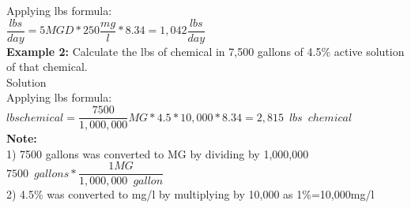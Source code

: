 Applying lbs formula:\\
$\dfrac{lbs}{day}=5 MGD *250\dfrac{mg}{l}*8.34 = \boxed{1,042\dfrac{lbs}{day}}$
\\
\vspace{6pt}
\textbf{Example 2:} Calculate the lbs of chemical in 7,500 gallons of 4.5\% active solution of that chemical.\\
Solution\\
Applying lbs formula:\\
$lbs chemical = \dfrac{7500}{1,000,000}MG * 4.5*10,000 *8.34 = \boxed{2,815 \enspace lbs \enspace chemical}$\\
\textbf{Note:}\\  
1) 7500 gallons was converted to MG by dividing by 1,000,000\\
$7500 \enspace gallons * \dfrac{1 MG}{1,000,000 \enspace gallon}$\\
2) 4.5\% was converted to mg/l by multiplying by 10,000 as 1\%=10,000mg/l









